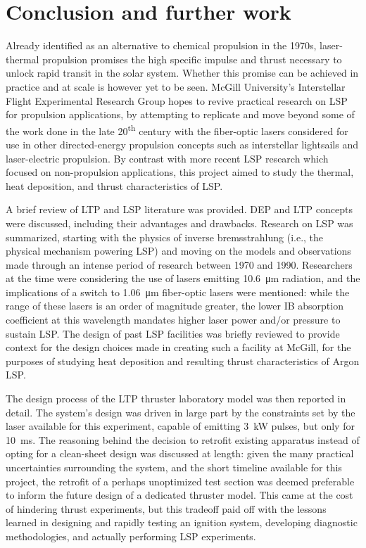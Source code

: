\chapter{Conclusion and further work}
    Already identified as an alternative to chemical propulsion in the 1970s, laser-thermal propulsion promises the high specific impulse and thrust necessary to unlock rapid transit in the solar system. Whether this promise can be achieved in practice and at scale is however yet to be seen. McGill University's Interstellar Flight Experimental Research Group hopes to revive practical research on LSP for propulsion applications, by attempting to replicate and move beyond some of the work done in the late 20\textsuperscript{th} century with the fiber-optic lasers considered for use in other directed-energy propulsion concepts such as interstellar lightsails and laser-electric propulsion. By contrast with more recent LSP research which focused on non-propulsion applications, this project aimed to study the thermal, heat deposition, and thrust characteristics of LSP.

    A brief review of LTP and LSP literature was provided. DEP and LTP concepts were discussed, including their advantages and drawbacks. Research on LSP was summarized, starting with the physics of inverse bremsstrahlung (i.e., the physical mechanism powering LSP) and moving on the models and observations made through an intense period of research between 1970 and 1990. Researchers at the time were considering the use of  lasers emitting \qty{10.6}{\um} radiation, and the implications of a switch to \qty{1.06}{\um} fiber-optic lasers were mentioned: while the range of these lasers is an order of magnitude greater, the lower IB absorption coefficient at this wavelength mandates higher laser power and/or pressure to sustain LSP. The design of past LSP facilities was briefly reviewed to provide context for the design choices made in creating such a facility at McGill, for the purposes of studying heat deposition and resulting thrust characteristics of Argon LSP.

    The design process of the LTP thruster laboratory model was then reported in detail. The system's design was driven in large part by the constraints set by the laser available for this experiment, capable of emitting \qty{3}{kW} pulses, but only for \qty{10}{ms}. The reasoning behind the decision to retrofit existing apparatus instead of opting for a clean-sheet design was discussed at length: given the many practical uncertainties surrounding the system, and the short timeline available for this project, the retrofit of a perhaps unoptimized test section was deemed preferable to inform the future design of a dedicated thruster model. This came at the cost of hindering thrust experiments, but this tradeoff paid off with the lessons learned in designing and rapidly testing an ignition system, developing diagnostic methodologies, and actually performing LSP experiments.


